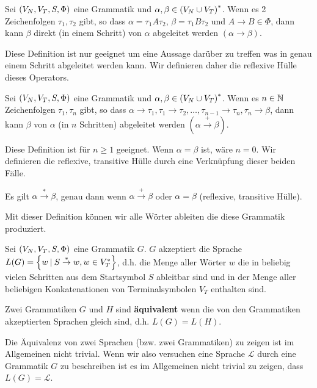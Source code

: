 \begin{defn}
Sei $\left(V_N,V_T,S,\Phi\right)$ eine Grammatik und $\alpha,\beta \in \left(V_N \cup V_T\right)^*$.
Wenn es 2 Zeichenfolgen $\tau_1,\tau_2$ gibt, so dass $\alpha=\tau_1 A \tau_2$, $\beta=\tau_1 B \tau_2$ und $A \to B \in \Phi$,
dann kann $\beta$ direkt (in einem Schritt) von $\alpha$ abgeleitet werden $(\alpha \to \beta)$.
\end{defn}

Diese Definition ist nur geeignet um eine Aussage darüber zu treffen was in genau einem Schritt abgeleitet werden kann. Wir definieren daher die reflexive Hülle dieses Operators.

\begin{defn}
Sei $\left(V_N,V_T,S,\Phi\right)$ eine Grammatik und $\alpha,\beta \in \left(V_N \cup V_T\right)^*$.
Wenn es $n \in \mathbb{N}$ Zeichenfolgen $\tau_1,\tau_n$ gibt, so dass $\alpha \to \tau_1, \tau_1 \to \tau_2 , \ldots , \tau_{n-1} \to \tau_n , \tau_n \to \beta$,
dann kann $\beta$ von $\alpha$ (in $n$ Schritten) abgeleitet werden $(\alpha \overset{+}{\to} \beta)$.
\end{defn}

Diese Definition ist für $n \geq 1$ geeignet. Wenn $\alpha = \beta$ ist, wäre $n=0$. Wir definieren die reflexive, transitive Hülle durch eine Verknüpfung dieser beiden Fälle.

\begin{defn}
Es gilt $\alpha \overset{*}{\to} \beta$, genau dann wenn $\alpha \overset{+}{\to} \beta$ oder $\alpha = \beta$ (reflexive, transitive Hülle).
\end{defn}

Mit dieser Definition können wir alle Wörter ableiten die diese Grammatik produziert.

\begin{defn}
Sei $\left(V_N,V_T,S,\Phi\right)$ eine Grammatik $G$. $G$ akzeptiert die Sprache $L(G)=\left\{w \: | \: S \overset{*}{\to} w, w \in V_T^*\right\}$, d.h. die Menge aller Wörter $w$ die in beliebig
vielen Schritten aus dem Startsymbol $S$ ableitbar sind und in der Menge aller beliebigen Konkatenationen von Terminalsymbolen $V_T$ enthalten sind.
\end{defn}

\begin{defn}
Zwei Grammatiken $G$ und $H$ sind \textbf{äquivalent} wenn die von den Grammatiken akzeptierten Sprachen gleich sind, d.h. $L(G)=L(H)$.
\end{defn}

Die Äquivalenz von zwei Sprachen (bzw. zwei Grammatiken) zu zeigen ist im Allgemeinen nicht trivial. Wenn wir also versuchen eine Sprache $\mathcal{L}$ durch eine Grammatik $G$ zu beschreiben
ist es im Allgemeinen nicht trivial zu zeigen, dass $L(G)=\mathcal{L}$.

